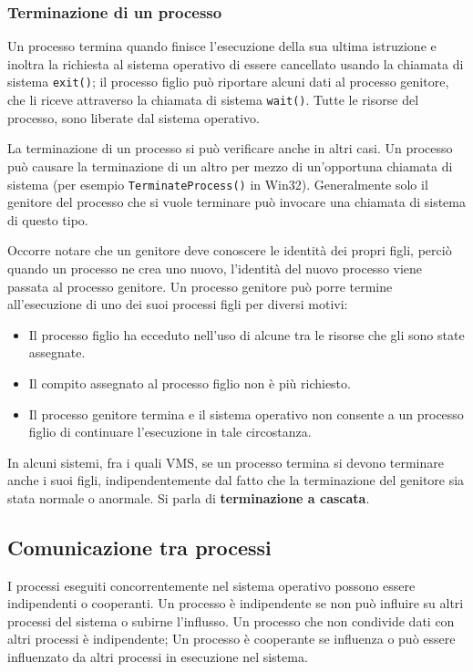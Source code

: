 \documentclass[11pt,a4paper]{article}
\begin{document}
\subsubsection{Terminazione di un processo}
Un processo termina quando finisce l'esecuzione della sua ultima istruzione e inoltra la ri­chiesta al sistema operativo di essere cancellato usando la chiamata di sistema \texttt{exit()};
il processo figlio può riportare alcuni dati al processo genitore, che li riceve
attraverso la chiamata di sistema \texttt{wait()}. Tutte le risorse del processo,
sono liberate dal sistema ope­rativo.

La terminazione di un processo si può verificare anche in altri casi. Un processo può
causare la terminazione di un altro per mezzo di un'opportuna chiamata di sistema (per
esempio \texttt{TerminateProcess()} in Win32). Generalmente solo il genitore del processo
che si vuole terminare può invocare una chiamata di sistema di questo tipo.

Occorre notare che un genitore deve conoscere le identità dei propri figli, perciò quando un
processo ne crea uno nuovo, l'identità del nuovo processo viene passata al processo genitore.
Un processo genitore può porre termine all'esecuzione di uno dei suoi processi figli
per diversi motivi:
\begin{itemize}[noitemsep, leftmargin=*]
  \item Il processo figlio ha ecceduto nell'uso di alcune tra le risorse che gli sono state assegna­te.
  \item Il compito assegnato al processo figlio non è più richiesto.
  \item Il processo genitore termina e il sistema operativo non consente a un processo figlio di
  continuare l'esecuzione in tale circostanza.
\end{itemize}
In alcuni sistemi, fra i quali VMS, se un processo termina si devono terminare anche i suoi fi­gli, indipendentemente dal fatto che la terminazione del genitore sia stata normale o anormale. Si parla di \textbf{terminazione a cascata}.

\subsection{Comunicazione tra processi}
I processi eseguiti concorrentemente nel sistema operativo possono essere indipendenti o cooperanti. Un processo è indipendente se non può influire su altri processi del sistema o subirne l'influsso. Un processo che non condivide dati con altri processi è indipendente; Un processo è cooperante se influenza o può essere influenzato da altri processi in esecuzione nel sistema.
\end{document}
